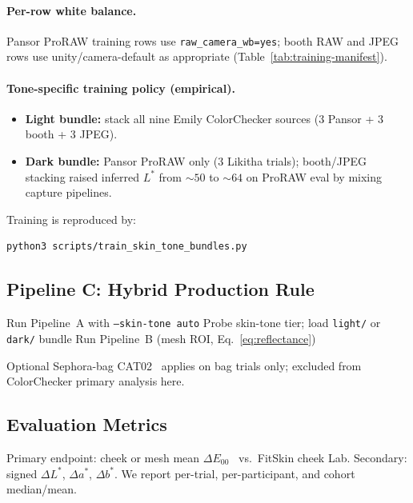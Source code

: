 \documentclass[11pt]{article}
\newcommand{\deee}{\ensuremath{\Delta E_{00}}}
\begin{document}
\paragraph{Per-row white balance.}
Pansor ProRAW training rows use \texttt{raw\_camera\_wb=yes}; booth RAW and JPEG rows use unity/camera-default as appropriate (Table~\ref{tab:training-manifest}).

\paragraph{Tone-specific training policy (empirical).}
\begin{itemize}[noitemsep]
  \item \textbf{Light bundle:} stack all nine Emily ColorChecker sources (3 Pansor + 3 booth + 3 JPEG).
  \item \textbf{Dark bundle:} Pansor ProRAW only (3 Likitha trials); booth/JPEG stacking raised inferred $L^*$ from ${\sim}50$ to ${\sim}64$ on ProRAW eval by mixing capture pipelines.
\end{itemize}

Training is reproduced by:
\begin{verbatim}
python3 scripts/train_skin_tone_bundles.py
\end{verbatim}

\subsection{Pipeline C: Hybrid Production Rule}

\begin{algorithmic}[1]
  \State Run Pipeline~A with \texttt{--skin-tone auto}
  \State Probe skin-tone tier; load \texttt{light/} or \texttt{dark/} bundle
  \State Run Pipeline~B (mesh ROI, Eq.~\ref{eq:reflectance})
\EndIf
\end{algorithmic}

Optional Sephora-bag CAT02~\cite{fitskin2026pansor,cie2004cat,Bradford1984} applies on bag trials only; excluded from ColorChecker primary analysis here.

\subsection{Evaluation Metrics}

Primary endpoint: cheek or mesh mean $\deee$~\cite{sharma2005ciede2000} vs.\ FitSkin cheek Lab.
Secondary: signed $\Delta L^*$, $\Delta a^*$, $\Delta b^*$.
We report per-trial, per-participant, and cohort median/mean.
\end{document}
